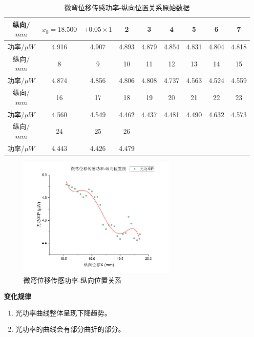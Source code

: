 \documentclass[a4paper,UTF8]{ctexart}
\begin{document}
\begin{table}[H]
    \centering
    \begin{tabular}{|c|c|c|c|c|c|c|c|c|}
    \hline
        纵向/$mm$ & $x_0 = 18.500$ & $+0.05 \times 1$ & 2 & 3 & 4 & 5 & 6 & 7 \\ \hline
        功率/$\mu W$ & 4.916 & 4.907 & 4.893 & 4.879 & 4.854 & 4.831 & 4.804 & 4.818 \\ \hline
        纵向/$mm$ & 8 & 9 & 10 & 11 & 12 & 13 & 14 & 15 \\ \hline
        功率/$\mu W$ & 4.874 & 4.856 & 4.806 & 4.808 & 4.737 & 4.563 & 4.524 & 4.559 \\ \hline
        纵向/$mm$ & 16 & 17 & 18 & 19 & 20 & 21 & 22 & 23 \\ \hline
        功率/$\mu W$ & 4.560 & 4.549 & 4.462 & 4.437 & 4.481 & 4.490 & 4.632 & 4.573 \\ \hline
        纵向/$mm$ & 24 & 25 & 26 &  &  &  &  &  \\ \hline
        功率/$\mu W$ & 4.443 & 4.426 & 4.479 &  &  &  &  &  \\ \hline
    \end{tabular}
    \caption{微弯位移传感功率-纵向位置关系原始数据}
\end{table}

\begin{figure}[H]
    \centering
    \begin{minipage}[b]{0.9\textwidth}
        \centering
        \includegraphics[width=0.7\textwidth]{./Graph6.png}
        \caption{微弯位移传感功率-纵向位置关系}
    \end{minipage}
\end{figure}

{\bfseries 变化规律}

\begin{enumerate}
    \item 光功率曲线整体呈现下降趋势。
    \item 光功率的曲线会有部分曲折的部分。
\end{enumerate}
\end{document}
